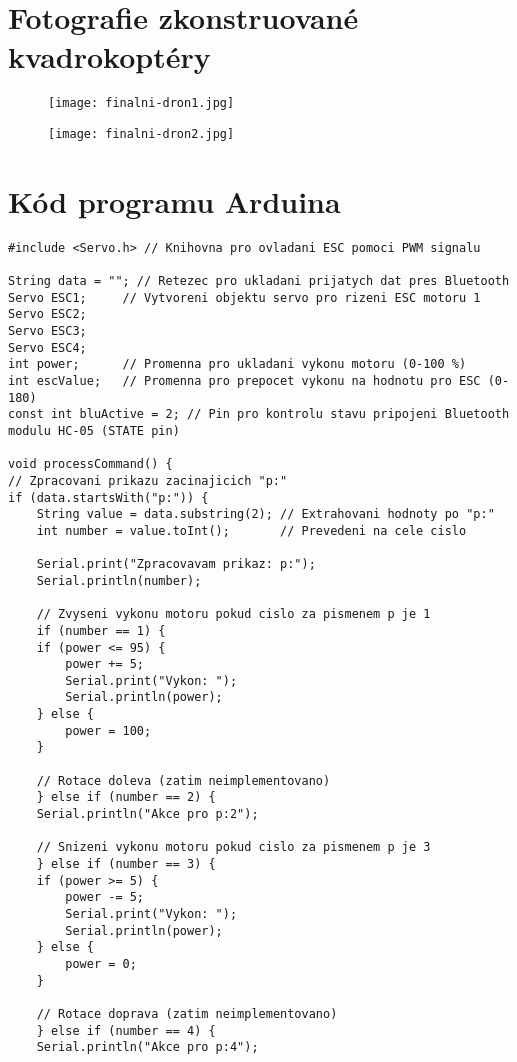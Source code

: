 \documentclass[12pt]{report}
\begin{document}
\begin{appendices}
\chapter[Fotografie zkonstruované kvadrokoptéry]{Fotografie zkonstruované kvadrokoptéry}	
\begin{figure}[H]
	\centering
	\texttt{[image: finalni-dron1.jpg]}
\end{figure}
\begin{figure}[H]
	\centering
	\texttt{[image: finalni-dron2.jpg]}
\end{figure}
\chapter[Kód programu Arduina]{Kód programu Arduina}
\begin{lstlisting}[title={}, caption={}, label={}, basicstyle=\footnotesize\ttfamily, inputencoding=utf8]
#include <Servo.h> // Knihovna pro ovladani ESC pomoci PWM signalu

String data = ""; // Retezec pro ukladani prijatych dat pres Bluetooth
Servo ESC1;     // Vytvoreni objektu servo pro rizeni ESC motoru 1
Servo ESC2;
Servo ESC3;
Servo ESC4;
int power;      // Promenna pro ukladani vykonu motoru (0-100 %)
int escValue;   // Promenna pro prepocet vykonu na hodnotu pro ESC (0-180)
const int bluActive = 2; // Pin pro kontrolu stavu pripojeni Bluetooth modulu HC-05 (STATE pin)

void processCommand() {
// Zpracovani prikazu zacinajicich "p:"
if (data.startsWith("p:")) {
	String value = data.substring(2); // Extrahovani hodnoty po "p:"
	int number = value.toInt();       // Prevedeni na cele cislo

	Serial.print("Zpracovavam prikaz: p:");
	Serial.println(number);

	// Zvyseni vykonu motoru pokud cislo za pismenem p je 1
	if (number == 1) {
	if (power <= 95) {
		power += 5;
		Serial.print("Vykon: ");
		Serial.println(power);
	} else {
		power = 100;
	}

	// Rotace doleva (zatim neimplementovano)
	} else if (number == 2) {
	Serial.println("Akce pro p:2");

	// Snizeni vykonu motoru pokud cislo za pismenem p je 3
	} else if (number == 3) {
	if (power >= 5) {
		power -= 5;
		Serial.print("Vykon: ");
		Serial.println(power);
	} else {
		power = 0;
	}

	// Rotace doprava (zatim neimplementovano)
	} else if (number == 4) {
	Serial.println("Akce pro p:4");


\end{lstlisting}
\end{appendices}
\end{document}
